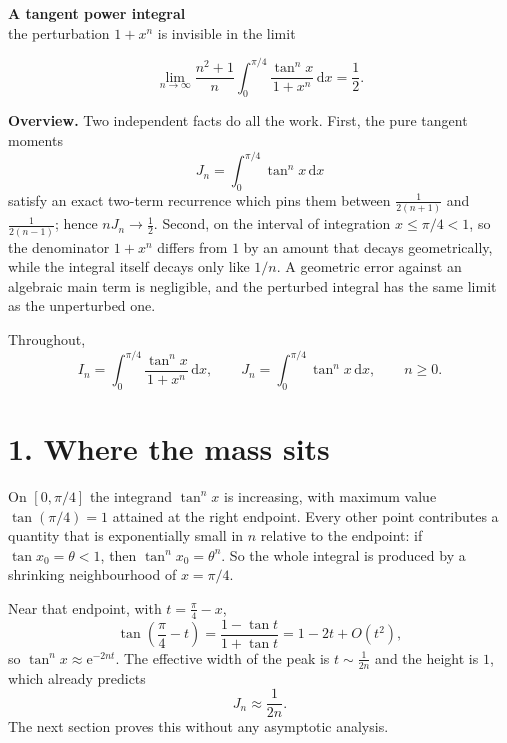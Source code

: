 \documentclass[12pt]{article}
\newcommand{\dd}{\,\mathrm{d}}
\newcommand{\e}{\mathrm{e}}
\newcommand{\In}{I_n}
\newcommand{\Jn}{J_n}
\begin{document}
\begin{center}
{\Large\bfseries A tangent power integral}\\[0.35em]
{\large the perturbation \(1+x^n\) is invisible in the limit}
\end{center}

\[
\boxed{\displaystyle
\lim_{n\to\infty}
\frac{n^2+1}{n}
\int_0^{\pi/4}
\frac{\tan^n x}{1+x^n}\dd x
=\frac12.}
\]

\textbf{Overview.}
Two independent facts do all the work. First, the pure tangent moments
\[
\Jn=\int_0^{\pi/4}\tan^n x\dd x
\]
satisfy an exact two-term recurrence which pins them between
\(\frac1{2(n+1)}\) and \(\frac1{2(n-1)}\); hence \(n\Jn\to\frac12\).
Second, on the interval of integration \(x\le\pi/4<1\), so the
denominator \(1+x^n\) differs from \(1\) by an amount that decays
geometrically, while the integral itself decays only like \(1/n\). A
geometric error against an algebraic main term is negligible, and the
perturbed integral has the same limit as the unperturbed one.

Throughout,
\[
\In=\int_0^{\pi/4}\frac{\tan^n x}{1+x^n}\dd x,
\qquad
\Jn=\int_0^{\pi/4}\tan^n x\dd x,
\qquad n\ge0.
\]

\section*{1. Where the mass sits}

On \([0,\pi/4]\) the integrand \(\tan^n x\) is increasing, with maximum
value \(\tan(\pi/4)=1\) attained at the right endpoint. Every other point
contributes a quantity that is exponentially small in \(n\) relative to
the endpoint: if \(\tan x_0=\theta<1\), then \(\tan^n x_0=\theta^n\).
So the whole integral is produced by a shrinking neighbourhood of
\(x=\pi/4\).

Near that endpoint, with \(t=\frac{\pi}{4}-x\),
\[
\tan\!\left(\frac\pi4-t\right)
=\frac{1-\tan t}{1+\tan t}
=1-2t+O(t^2),
\]
so \(\tan^n x\approx \e^{-2nt}\). The effective width of the peak is
\(t\sim\frac1{2n}\) and the height is \(1\), which already predicts
\[
\Jn\approx\frac1{2n}.
\tag{1}
\]
The next section proves this without any asymptotic analysis.

\begin{center}
\end{center}
\end{document}
